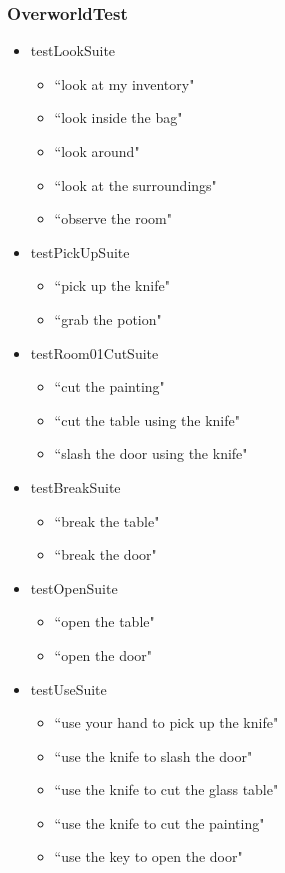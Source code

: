 \documentclass[11pt]{article}
\begin{document}
\begin{appendices}
\subsubsection{OverworldTest}
\begin{scriptsize}
\begin{itemize}
\item testLookSuite
	\begin{itemize}
	\item ``look at my inventory"
	\item ``look inside the bag"
	\item ``look around"
	\item ``look at the surroundings"
	\item ``observe the room"
	\end{itemize}
\item testPickUpSuite
	\begin{itemize}
	\item ``pick up the knife"
	\item ``grab the potion"
	\end{itemize}
\item testRoom01CutSuite
	\begin{itemize}
	\item ``cut the painting"
	\item ``cut the table using the knife"
	\item ``slash the door using the knife"
	\end{itemize}
\item testBreakSuite
	\begin{itemize}
	\item ``break the table"
	\item ``break the door"
	\end{itemize}
\item testOpenSuite
	\begin{itemize}
	\item ``open the table"
	\item ``open the door"
	\end{itemize}
\item testUseSuite
	\begin{itemize}
	\item ``use your hand to pick up the knife"
	\item ``use the knife to slash the door"
	\item ``use the knife to cut the glass table"
	\item ``use the knife to cut the painting"
	\item ``use the key to open the door"

\end{itemize}
\end{itemize}
\end{scriptsize}
\end{appendices}
\end{document}
